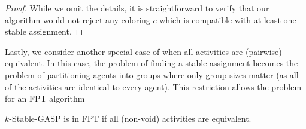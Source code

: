 \begin{proof}
While we omit the details, it is straightforward to verify that our algorithm would not reject any coloring $c$ which is compatible with at least one stable assignment.
\end{proof}

Lastly, we consider another special case of \GASPs when all activities are (pairwise) equivalent.
In this case, the problem of finding a stable assignment becomes the problem of partitioning agents into groups where only group sizes matter (as all of the activities are identical to every agent). This restriction allows the problem for an FPT algorithm
\begin{theorem} \label{GASP:thm:stable_fpt_equiv}
$k$-Stable-GASP is in FPT if all (non-void) activities are equivalent.
%
\end{theorem}
